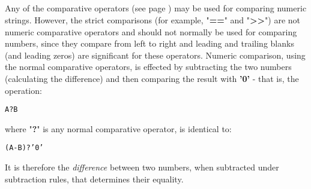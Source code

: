 \subsection{}\label{}
 Any of the  comparative operators (see page \pageref{refcomps})  may be used
for comparing numeric strings.
However, the strict comparisons (for example, "\textbf{==}" and
"\textbf{>>}") are not numeric comparative operators and should
not normally be used for comparing numbers, since they compare from left
to right and leading and trailing blanks (and leading zeros) are
significant for these operators.
 Numeric comparison, using the normal comparative operators, is
effected by subtracting the two numbers (calculating the difference) and
then comparing the result with \textbf{'0'} - that is, the
operation:
\begin{alltt}
A ? B
\end{alltt}
where "\textbf{?}" is any normal comparative operator, is
identical to:
\begin{alltt}
(A - B) ? '0'
\end{alltt}
It is therefore the \emph{difference} between two numbers, when
subtracted under \nr{} subtraction rules, that determines their equality.
